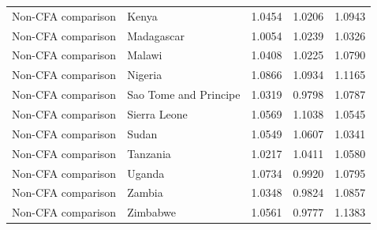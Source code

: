 \begin{table}
\begin{tabular}[t]{llrrr}
Non-CFA comparison & Kenya & 1.0454 & 1.0206 & 1.0943\\
\addlinespace
Non-CFA comparison & Madagascar & 1.0054 & 1.0239 & 1.0326\\
Non-CFA comparison & Malawi & 1.0408 & 1.0225 & 1.0790\\
Non-CFA comparison & Nigeria & 1.0866 & 1.0934 & 1.1165\\
Non-CFA comparison & Sao Tome and Principe & 1.0319 & 0.9798 & 1.0787\\
Non-CFA comparison & Sierra Leone & 1.0569 & 1.1038 & 1.0545\\
\addlinespace
Non-CFA comparison & Sudan & 1.0549 & 1.0607 & 1.0341\\
Non-CFA comparison & Tanzania & 1.0217 & 1.0411 & 1.0580\\
Non-CFA comparison & Uganda & 1.0734 & 0.9920 & 1.0795\\
Non-CFA comparison & Zambia & 1.0348 & 0.9824 & 1.0857\\
Non-CFA comparison & Zimbabwe & 1.0561 & 0.9777 & 1.1383\\
\bottomrule
\end{tabular}
\end{table}